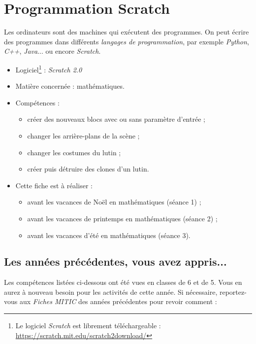 \chapter{Programmation Scratch}  

Les ordinateurs sont des machines qui exécutent des programmes. On peut écrire des programmes dans différents \emph{langages de programmation}, par exemple \emph{Python}, \emph{C++}, \emph{Java}... ou encore \emph{Scratch}.

{\footnotesize
\begin{itemize}
\item Logiciel\footnote{Le logiciel \emph{Scratch} est librement téléchargeable : \url{https://scratch.mit.edu/scratch2download/}} : \emph{Scratch 2.0}
\item Matière concernée : mathématiques.
\item Compétences : 
        \begin{itemize}
        \item créer des nouveaux blocs avec ou sans paramètre d'entrée ;
        \item changer les arrière-plans de la scène ;
        \item changer les costumes du lutin ;
        \item créer puis détruire des clones d'un lutin. 
        \end{itemize}
\item Cette fiche est à réaliser :
        \begin{itemize}
        \item avant les vacances de Noël en mathématiques (séance 1) ;
        \item avant les vacances de printemps en mathématiques (séance 2) ;
        \item avant les vacances d'été en mathématiques (séance 3). 
        \end{itemize}
\end{itemize}
} %




\section*{Les années précédentes, vous avez appris...}

Les compétences listées ci-dessous ont été vues en classes de 6 et de 5. Vous en aurez à nouveau besoin pour les activités de cette année. Si nécessaire, reportez-vous aux \emph{Fiches MITIC} des années précédentes pour revoir comment :  

